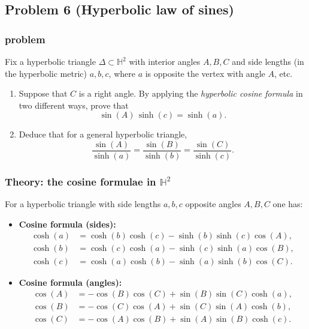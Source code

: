 \documentclass[12pt,a4paper]{article}
\newcommand{\HH}{\mathbb{H}}
\theoremstyle{plain}
\theoremstyle{definition}      %
\begin{document}
	
	\clearpage
	
	
	\subsection*{Problem 6 (Hyperbolic law of sines)}
	
\subsubsection*{problem}
		Fix a hyperbolic triangle $\Delta\subset \HH^2$ with interior angles $A,B,C$ and side lengths
		(in the hyperbolic metric) $a,b,c$, where $a$ is opposite the vertex with angle $A$, etc.
		\begin{enumerate}
			\item Suppose that $C$ is a right angle. By applying the \emph{hyperbolic cosine formula} in two different ways,
			prove that
			\[
			\sin(A)\,\sinh(c)=\sinh(a).
			\]
			\item Deduce that for a general hyperbolic triangle,
			\[
			\frac{\sin(A)}{\sinh(a)}=\frac{\sin(B)}{\sinh(b)}=\frac{\sin(C)}{\sinh(c)}.
			\]
		\end{enumerate}

	
	\subsubsection*{Theory: the cosine formulae in $\HH^2$}
	For a hyperbolic triangle with side lengths $a,b,c$ opposite angles $A,B,C$ one has:
	
	\begin{itemize}
		\item \textbf{Cosine formula (sides):}
		\begin{align*}
			\cosh(a)&=\cosh(b)\cosh(c)-\sinh(b)\sinh(c)\cos(A),\\
			\cosh(b)&=\cosh(c)\cosh(a)-\sinh(c)\sinh(a)\cos(B),\\
			\cosh(c)&=\cosh(a)\cosh(b)-\sinh(a)\sinh(b)\cos(C).
		\end{align*}
		
		\item \textbf{Cosine formula (angles):}
		\begin{align*}
			\cos(A)&=-\cos(B)\cos(C)+\sin(B)\sin(C)\cosh(a),\\
			\cos(B)&=-\cos(C)\cos(A)+\sin(C)\sin(A)\cosh(b),\\
			\cos(C)&=-\cos(A)\cos(B)+\sin(A)\sin(B)\cosh(c).
		\end{align*}
	\end{itemize}
	
\end{document}
